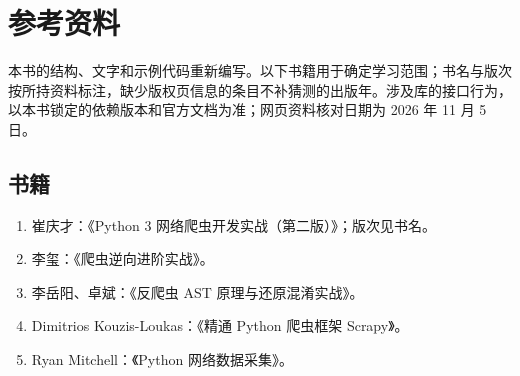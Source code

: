 \chapter{参考资料}\label{app:references}
本书的结构、文字和示例代码重新编写。以下书籍用于确定学习范围；书名与版次按所持资料标注，缺少版权页信息的条目不补猜测的出版年。涉及库的接口行为，以本书锁定的依赖版本和官方文档为准；网页资料核对日期为 2026 年 11 月 5 日。

\section*{书籍}
\begin{enumerate}
\item 崔庆才：《Python 3 网络爬虫开发实战（第二版）》；版次见书名。
\item 李玺：《爬虫逆向进阶实战》。
\item 李岳阳、卓斌：《反爬虫 AST 原理与还原混淆实战》。
\item Dimitrios Kouzis-Loukas：《精通 Python 爬虫框架 Scrapy》。
\item Ryan Mitchell：《Python 网络数据采集》。
\end{enumerate}

